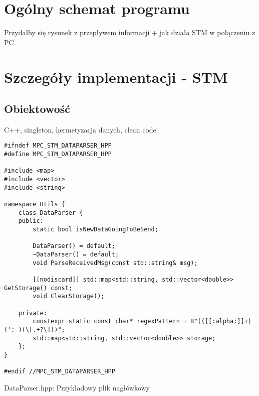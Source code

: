 \section{Ogólny schemat programu} \label{sec:scheme}
Przydałby się rysunek z przepływem informacji + jak działa STM w połączeniu z PC.

\section{Szczegóły implementacji - STM} \label{sec:details-stm}

\subsection{Obiektowość} \label{sec:objects}
C++, singleton, hermetyzacja danych, clean code
\begin{listing}[htb]
\begin{verbatim}
#ifndef MPC_STM_DATAPARSER_HPP
#define MPC_STM_DATAPARSER_HPP

#include <map>
#include <vector>
#include <string>

namespace Utils {
    class DataParser {
    public:
        static bool isNewDataGoingToBeSend;

        DataParser() = default;
        ~DataParser() = default;
        void ParseReceivedMsg(const std::string& msg);

        [[nodiscard]] std::map<std::string, std::vector<double>> GetStorage() const;
        void ClearStorage();

    private:
        constexpr static const char* regexPattern = R"(([[:alpha:]]+)(': )(\[.+?\]))";
        std::map<std::string, std::vector<double>> storage;
    };
}

#endif //MPC_STM_DATAPARSER_HPP

\end{verbatim}
\caption{DataParser.hpp: Przykładowy plik nagłówkowy}
\label{lst:header_example`}
\end{listing}

